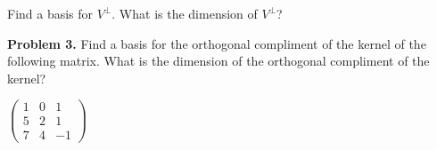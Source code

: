\documentclass[oneside,12pt]{amsart}
\begin{document}
\bigskip

Find a basis for $V^{\perp}$. What is the dimension of $V^{\perp}$?

\bigskip
\bigskip
\bigskip
\bigskip

\textbf{Problem 3.} Find a basis for the orthogonal compliment of the
kernel of the following matrix. What is the dimension of the orthogonal
compliment of the kernel?

\bigskip

$
\begin{pmatrix}
1 & 0 & 1 \\
5 & 2 & 1 \\
7 & 4 & -1
\end{pmatrix}
$
\end{document}
